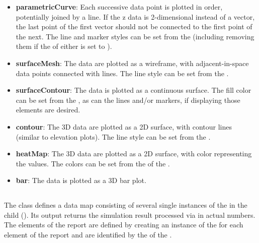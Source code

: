 \begin{blockChanged}
\begin{itemize}
\item \textbf{parametricCurve}: Each successive data point is plotted in order, potentially joined by a line.  If the z data is 2-dimensional instead of a vector, the last point of the first vector should not be connected to the first point of the next.  The line and marker styles can be set from the  (including removing them if the  of either is set to ).
\item \textbf{surfaceMesh}: The data are plotted as a wireframe, with adjacent-in-space data points connected with lines.  The line style can be set from the .
\item \textbf{surfaceContour}: The data is plotted as a continuous surface.  The fill color can be set from the , as can the lines and/or markers, if displaying those elements are desired.
\item \textbf{contour}:  The 3D data are plotted as a 2D surface, with contour lines (similar to elevation plots).  The line style can be set from the .
\item \textbf{heatMap}:  The 3D data are plotted as a 2D surface, with color representing the values.  The colors can be set from the  of the .
\item \textbf{bar}: The data is plotted as a 3D bar plot.
\end{itemize}



\end{blockChanged}
%




\subsection{}
\label{class:report}
\label{class:listOfDataSets}
\begin{blockChanged}
The  class defines a data map consisting of several single instances of the \DataSet in the child  (). Its output returns the simulation result processed via \DataGenerators in actual numbers. The elements of the report are defined by creating an instance of the \DataSet for each element of the report and are identified by the  of the \DataSet. 
\end{blockChanged}

